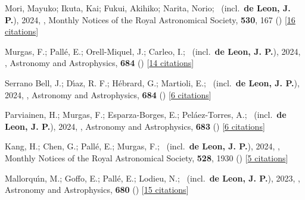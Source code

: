 \item[{\color{numcolor}\scriptsize63}] Mori, Mayuko; Ikuta, Kai; Fukui, Akihiko; Narita, Norio; \etal\ (incl.\ \textbf{de Leon, J. P.}), 2024, , Monthly Notices of the Royal Astronomical Society, \textbf{530}, 167 () [\href{https://ui.adsabs.harvard.edu/abs/2024MNRAS.530..167M}{16 citations}]

\item[{\color{numcolor}\scriptsize62}] Murgas, F.; Pall{\'e}, E.; Orell-Miquel, J.; Carleo, I.; \etal\ (incl.\ \textbf{de Leon, J. P.}), 2024, , Astronomy and Astrophysics, \textbf{684} () [\href{https://ui.adsabs.harvard.edu/abs/2024A&A...684A..83M}{14 citations}]

\item[{\color{numcolor}\scriptsize61}] Serrano Bell, J.; D{\'\i}az, R. F.; H{\'e}brard, G.; Martioli, E.; \etal\ (incl.\ \textbf{de Leon, J. P.}), 2024, , Astronomy and Astrophysics, \textbf{684} () [\href{https://ui.adsabs.harvard.edu/abs/2024A&A...684A...6S}{6 citations}]

\item[{\color{numcolor}\scriptsize60}] Parviainen, H.; Murgas, F.; Esparza-Borges, E.; Pel{\'a}ez-Torres, A.; \etal\ (incl.\ \textbf{de Leon, J. P.}), 2024, , Astronomy and Astrophysics, \textbf{683} () [\href{https://ui.adsabs.harvard.edu/abs/2024A&A...683A.170P}{6 citations}]

\item[{\color{numcolor}\scriptsize59}] Kang, H.; Chen, G.; Pall{\'e}, E.; Murgas, F.; \etal\ (incl.\ \textbf{de Leon, J. P.}), 2024, , Monthly Notices of the Royal Astronomical Society, \textbf{528}, 1930 () [\href{https://ui.adsabs.harvard.edu/abs/2024MNRAS.528.1930K}{5 citations}]

\item[{\color{numcolor}\scriptsize58}] Mallorqu{\'\i}n, M.; Goffo, E.; Pall{\'e}, E.; Lodieu, N.; \etal\ (incl.\ \textbf{de Leon, J. P.}), 2023, , Astronomy and Astrophysics, \textbf{680} () [\href{https://ui.adsabs.harvard.edu/abs/2023A&A...680A..76M}{15 citations}]


